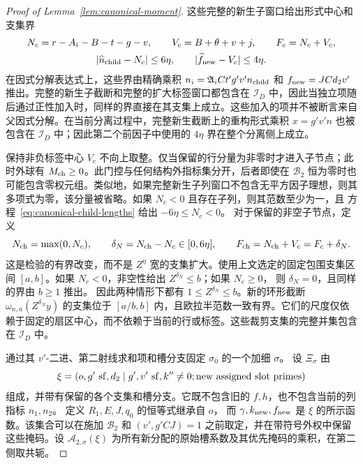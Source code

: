 \documentclass[11pt,a4paper]{article}
\numberwithin{equation}{section}
\numberwithin{figure}{section}
\theoremstyle{definition}
\theoremstyle{remark}
\begin{document}
\begin{proof}[Proof of Lemma~\ref{lem:canonical-moment}]
这些完整的新生子窗口给出形式中心和支集界
\begin{equation}\label{eq:canonical-child-lengths}
 \begin{gathered}
 N_c=r-A_i-B-t-g-v,\qquad V_c=B+\theta+v+j,\qquad F_c=N_c+V_c,\\
 |\widehat n_{\rm child}-N_c|\le6\eta,\qquad
 |\widehat f_{\rm new}-V_c|\le4\eta.
 \end{gathered}
\end{equation}
在因式分解表达式上，这些界由精确乘积
\(n_i=\mathfrak A_iCt'g'v'n_{\rm child}\) 和
\(f_{\rm new}=JCd_2v'\) 推出。完整的新生子截断和完整的扩大标签窗口都包含在 \(\mathcal I_D\) 中，因此当独立项随后通过正性加入时，同样的界直接在其支集上成立。这些加入的项并不被断言来自父因式分解。在当前分离过程中，完整新生截断上的重构形式乘积 \(x=g'v'n\) 也被包含在 \(\mathcal I_D\) 中；因此第二个前因子中使用的 \(4\eta\) 界在整个分离侧上成立。

保持非负标签中心 \(V_c\) 不向上取整。仅当保留的行分量为非零时才进入子节点；此时外球有 \(M_{\rm ch}\ge0\)。此门控与任何结构外指标集分开，后者即使在 \(\mathcal B_2\) 恒为零时也可能包含零权元组。类似地，如果完整新生子列窗口不包含无平方因子理想，则其多项式为零，该分量被省略。如果 \(N_c<0\) 且存在子列，则其范数至少为一，且
方程~\eqref{eq:canonical-child-lengths} 给出 \(-6\eta\le N_c<0\)。
对于保留的非空子节点，定义
\begin{equation}\label{eq:inverse-child-clipping}
 N_{\rm ch}=\max(0,N_c),\qquad \delta_N=N_{\rm ch}-N_c\in[0,6\eta],
 \qquad F_{\rm ch}=N_{\rm ch}+V_c=F_c+\delta_N.
\end{equation}
这是检验的有界改变，而不是 \(Z^\eta\) 宽的支集扩大。使用上文选定的固定包围支集区间 \([a,b]\)。如果
\(N_c<0\)，非空性给出 \(Z^{\delta_N}\le b\)；如果 \(N_c\ge0\)，
则 \(\delta_N=0\)，且同样的界由 \(b\ge1\) 推出。
因此两种情形下都有 \(1\le Z^{\delta_N}\le b\)。新的环形截断
\(\omega_{n,a}(Z^{\delta_N}y)\) 的支集位于 \([a/b,b]\) 内，且欧拉半范数一致有界。它们的尺度仅依赖于固定的扇区中心，而不依赖于当前的行或标签。这些裁剪支集的完整并集包含在 \(\mathcal I_D\) 中。

通过其 \(v'\)-二进、第二射线求和项和槽分支固定 \(\sigma_0\) 的一个加细 \(\sigma\)。
设 \(\Xi_\sigma\) 由
\[
 \xi=(o,g'\ {\rm sf},d_2\mid g',v'\ {\rm sf},k''\ne0;
               \text{new assigned slot primes})
\]
组成，并带有保留的各个支集和槽分支。它既不包含旧的 \(f,h\)，也不包含当前的列指标 \(n_1,n_2\)。
定义 \(R_1,E,J,q_0\) 的恒等式继承自 \(o\)，
而 \(\gamma,k_{\rm new},f_{\rm new}\) 是 \(\xi\) 的所示函数。该集合可以在施加 \(\mathcal B_2\) 和
\((v',g'CJ)=1\) 之前取定，并在带符号外权中保留这些掩码。设
\(\mathcal A_{2,\sigma}(\xi)\) 为所有新分配的原始槽系数及其优先掩码的乘积，在第二侧取共轭。


\end{proof}
\end{document}
